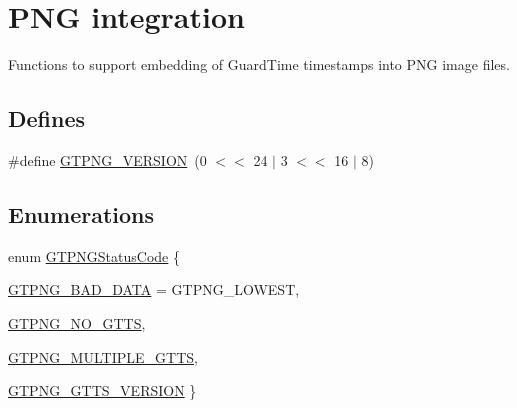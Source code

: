 \hypertarget{group__png}{
\section{PNG integration}
\label{group__png}
}


Functions to support embedding of GuardTime timestamps into PNG image files.  


\subsection*{Defines}
\begin{DoxyCompactItemize}
\item 
\#define \hyperlink{group__png_ga85c3c057105e954a4504dbe98ba9a2ba}{GTPNG\_\-VERSION}~(0 $<$$<$ 24 $|$ 3 $<$$<$ 16 $|$ 8)
\end{DoxyCompactItemize}
\subsection*{Enumerations}
\begin{DoxyCompactItemize}
\item 
enum \hyperlink{group__png_ga70021c722b39d6b5945e9dd65b5d3b77}{GTPNGStatusCode} \{ \par
\hyperlink{group__png_gga70021c722b39d6b5945e9dd65b5d3b77a39011e68decc1c79ddc0424d9e42d581}{GTPNG\_\-BAD\_\-DATA} =  GTPNG\_\-LOWEST, 
\par
\hyperlink{group__png_gga70021c722b39d6b5945e9dd65b5d3b77ae3e19c689f17d7a2ea6e13f8db297a1d}{GTPNG\_\-NO\_\-GTTS}, 
\par
\hyperlink{group__png_gga70021c722b39d6b5945e9dd65b5d3b77a20c972dfb42a0a00c24ee1f3382a270e}{GTPNG\_\-MULTIPLE\_\-GTTS}, 
\par
\hyperlink{group__png_gga70021c722b39d6b5945e9dd65b5d3b77a34a60e01de9485155446af3ee0d2cef6}{GTPNG\_\-GTTS\_\-VERSION}
 \}
\end{DoxyCompactItemize}
